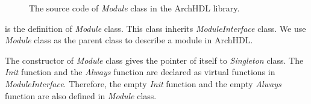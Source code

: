 \begin{figure}[t]
 
 \caption{The source code of \textit{Module} class in the ArchHDL library.}
 \label{src:module}
\end{figure}

 is the definition of \textit{Module} class.
This class inherits \textit{ModuleInterface} class.
We use \textit{Module} class as the parent class to describe a module in ArchHDL.

The constructor of \textit{Module} class gives the pointer of itself to \textit{Singleton} class.
The \textit{Init} function and the \textit{Always} function are declared as virtual functions in \textit{ModuleInterface}.
Therefore, the empty \textit{Init} function and the empty \textit{Always} function are also defined in \textit{Module} class.
